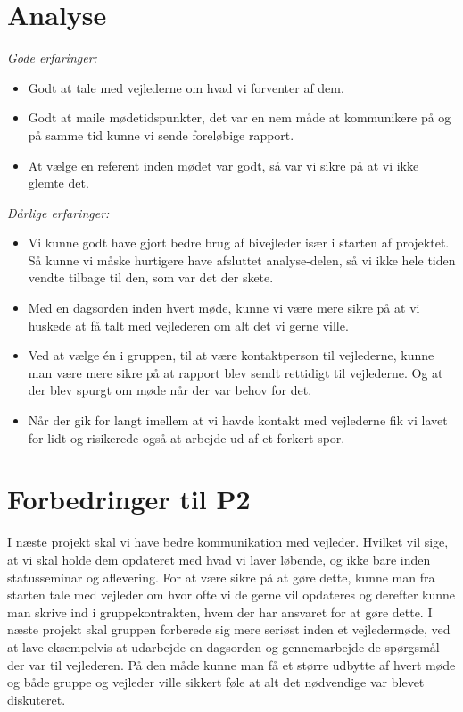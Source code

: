\section{Analyse}

\emph{Gode erfaringer:}
\begin{itemize}
\item	Godt at tale med vejlederne om hvad vi forventer af dem.

\item Godt at maile mødetidspunkter, det var en nem måde at kommunikere på og på samme tid kunne vi sende foreløbige rapport.

\item At vælge en referent inden mødet var godt, så var vi sikre på at vi ikke glemte det.
\end{itemize}\emph{Dårlige erfaringer:}
\begin{itemize}
\item	Vi kunne godt have gjort bedre brug af bivejleder især i starten af projektet. Så kunne vi måske hurtigere have afsluttet analyse-delen, så vi ikke hele tiden vendte tilbage til den, som var det der skete.

\item	Med en dagsorden inden hvert møde, kunne vi være mere sikre på at vi huskede at få talt med vejlederen om alt det vi gerne ville.

\item	Ved at vælge én i gruppen, til at være kontaktperson til vejlederne, kunne man være mere sikre på at rapport blev sendt rettidigt til vejlederne. Og at der blev spurgt om møde når der var behov for det.

\item	Når der gik for langt imellem at vi havde kontakt med vejlederne fik vi lavet for lidt og risikerede også at arbejde ud af et forkert spor.
\end{itemize}

\section{Forbedringer til P2}

I næste projekt skal vi have bedre kommunikation med vejleder. Hvilket vil sige, at vi skal holde dem opdateret med hvad vi laver løbende, og ikke bare inden statusseminar og aflevering. For at være sikre på at gøre dette, kunne man fra starten tale med vejleder om hvor ofte vi de gerne vil opdateres og derefter kunne man skrive ind i gruppekontrakten, hvem der har ansvaret for at gøre dette. 
I næste projekt skal gruppen forberede sig mere seriøst inden et vejledermøde, ved at lave eksempelvis at udarbejde en dagsorden og gennemarbejde de spørgsmål der var til vejlederen. På den måde kunne man få et større udbytte af hvert møde og både gruppe og vejleder ville sikkert føle at alt det nødvendige var blevet diskuteret. 
